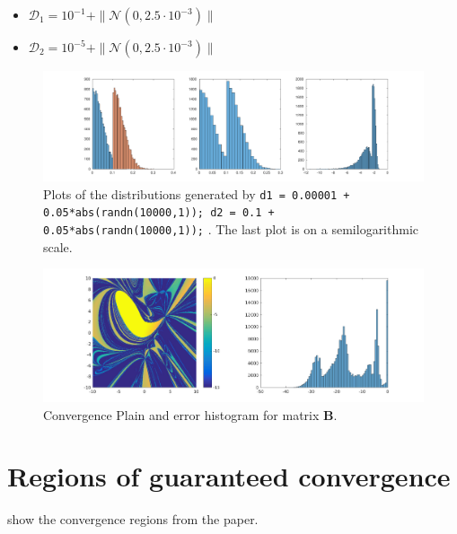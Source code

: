 \begin{frame}
\begin{itemize}
\item  $\mathcal{D}_1 = 10^{-1} + \| \mathcal{N}(0,2.5 \cdot 10^{-3}) \| $ \\
\item  $\mathcal{D}_2 = 10^{-5} + \| \mathcal{N}(0,2.5 \cdot 10^{-3}) \| $ \\
\end{itemize}

\begin{figure}
\centering
\includegraphics[width=1\linewidth]{../images/randnHist}
\caption{Plots of the distributions generated by
\texttt{d1 = 0.00001 + 0.05*abs(randn(10000,1));
d2 = 0.1 + 0.05*abs(randn(10000,1));} . The last plot is on a semilogarithmic scale. }
\end{figure}
\end{frame}

\begin{frame}
\begin{figure}
\centering
\includegraphics[width=1\linewidth]{../images/gmresBHist}
\caption{Convergence Plain and error histogram for matrix $\mathbf{B}$.}
\end{figure}
\end{frame}

\section{Regions of guaranteed convergence}
\begin{frame}
show the convergence regions from the paper.
\end{frame}



